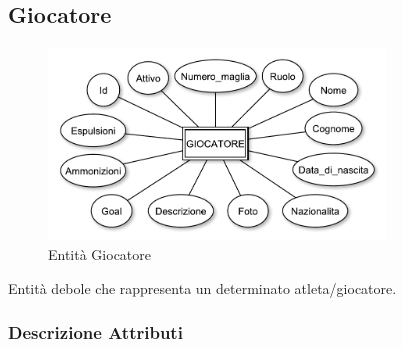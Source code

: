 	\subsection{Giocatore}
	
		\begin{figure}[h]
			\centering
			\includegraphics[width=0.8\textwidth]
			{immagini/11-giocatore}
			
			\caption{Entità Giocatore}
		\end{figure}
		
		Entità debole che rappresenta un determinato atleta/giocatore.
		
		\subsubsection*{Descrizione Attributi}
		
